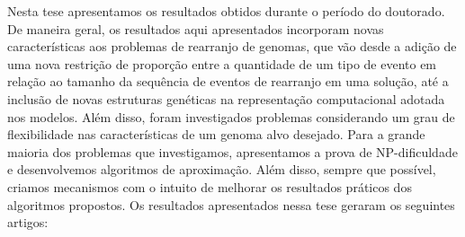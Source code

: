 
Nesta tese apresentamos os resultados obtidos durante o período do doutorado. De maneira geral, os resultados aqui apresentados incorporam novas características aos problemas de rearranjo de genomas, que vão desde a adição de uma nova restrição de proporção entre a quantidade de um tipo de evento em relação ao tamanho da sequência de eventos de rearranjo em uma solução, até a inclusão de novas estruturas genéticas na representação computacional adotada nos modelos. Além disso, foram investigados problemas considerando um grau de flexibilidade nas características de um genoma alvo desejado. Para a grande maioria dos problemas que investigamos, apresentamos a prova de NP-dificuldade e desenvolvemos algoritmos de aproximação. Além disso, sempre que possível, criamos mecanismos com o intuito de melhorar os resultados práticos dos algoritmos propostos. Os resultados apresentados nessa tese geraram os seguintes artigos:

